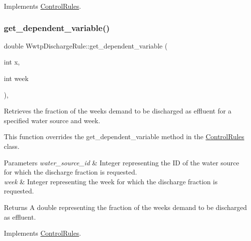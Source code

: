 Implements \mbox{\hyperlink{classControlRules}{Control\+Rules}}.

\mbox{\label{classWwtpDischargeRule_a8eade5d595ec0fdc76769e67c7ffc5f4}} 
\subsubsection{\texorpdfstring{get\+\_\+dependent\+\_\+variable()}{get\_dependent\_variable()}\hspace{0.1cm}{\footnotesize\ttfamily [4/4]}}
{\footnotesize\ttfamily double Wwtp\+Discharge\+Rule\+::get\+\_\+dependent\+\_\+variable (\begin{DoxyParamCaption}\item[{int}]{x,  }\item[{int}]{week }\end{DoxyParamCaption})\hspace{0.3cm}{\ttfamily [override]}, {\ttfamily [virtual]}}



Retrieves the fraction of the week\textquotesingle{}s demand to be discharged as effluent for a specified water source and week. 

This function overrides the {\ttfamily get\+\_\+dependent\+\_\+variable} method in the {\ttfamily \mbox{\hyperlink{classControlRules}{Control\+Rules}}} class.


\begin{DoxyParams}{Parameters}
{\em water\+\_\+source\+\_\+id} & Integer representing the ID of the water source for which the discharge fraction is requested. \\
\hline
{\em week} & Integer representing the week for which the discharge fraction is requested.\\
\hline
\end{DoxyParams}
\begin{DoxyReturn}{Returns}
A double representing the fraction of the week\textquotesingle{}s demand to be discharged as effluent. 
\end{DoxyReturn}


Implements \mbox{\hyperlink{classControlRules}{Control\+Rules}}.

\mbox{\label{classWwtpDischargeRule_a59b2b1f56607106a237011f16a3915c3}} 

